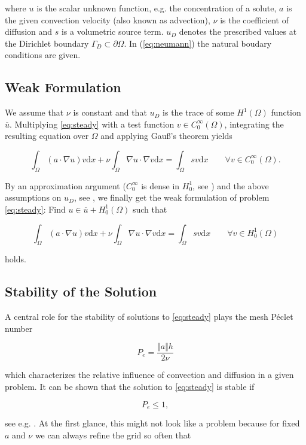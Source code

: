 \documentclass[a4paper, 11pt, twoside]{article}
\newcommand{\dd}{\mathrm{d}}
\begin{document}
where $u$ is the scalar unknown function, e.g. the concentration of a solute, $a$ is the given convection velocity (also known as advection), $\nu$ is the coefficient of diffusion and $s$ is a volumetric source term. $u_{D}$ denotes the prescribed values at the Dirichlet boundary $\Gamma_D \subset \partial\Omega$. In (\ref{eq:neumann}) the natural boudary conditions are given.

\subsection{Weak Formulation}
We assume that $\nu$ is constant and that $u_{D}$ is the trace of some $H^{1}(\Omega)$ function $\overline{u}$. Multiplying \eqref{eq:steady} with a test function $v \in C_{0}^{\infty}(\Omega)$, integrating the resulting equation over $\Omega$ and applying Gau{\ss}'s theorem yields

	\[\int_{\Omega}\left(a \cdot \nabla u\right)v \dd x + \nu \int_{\Omega}\nabla u \cdot \nabla v \dd x = \int_{\Omega}s v \dd x \qquad \forall v \in C_{0}^{\infty}(\Omega).\]
	
By an approximation argument ($C_{0}^{\infty}$ is dense in $H_{0}^{1}$, see \cite{Evans}) and the above assumptions on $u_{D}$, see \cite{Evans}, we finally get the weak formulation of problem \eqref{eq:steady}: Find $u \in \overline{u} + H_{0}^{1}(\Omega)$ such that

	\[\int_{\Omega}\left(a \cdot \nabla u\right)v \dd x + \nu \int_{\Omega}\nabla u \cdot \nabla v \dd x = \int_{\Omega}s v \dd x \qquad \forall v \in H_{0}^{1}(\Omega)\]
	
holds.

\subsection{Stability of the Solution}

A central role for the stability of solutions to \eqref{eq:steady} plays the mesh P\'{e}clet number

	\begin{equation}\label{eq:Peclet}
		P_{e} = \frac{\Vert a \Vert h}{2\nu}
	\end{equation}

which characterizes the relative influence of convection and diffusion in a given problem. It can be shown that the solution to \eqref{eq:steady} is stable if

	\[P_{e} \leq 1,\]
	
see e.g. \cite{Quarteroni}. At the first glance, this might not look like a problem because for fixed $a$ and $\nu$ we can always refine the grid so often that
\end{document}
